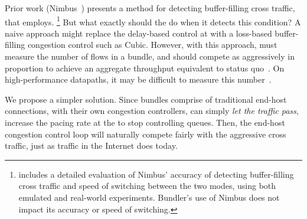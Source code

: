 Prior work (Nimbus~\cite{nimbus-arxiv}) presents a method for detecting buffer-filling cross traffic, that \name employs.
\footnote{\cite{nimbus-arxiv} includes a detailed evaluation of Nimbus' accuracy of detecting buffer-filling cross traffic and speed of switching between the two modes, using both emulated and real-world experiments. Bundler's use of Nimbus does not impact its accuracy or speed of switching.}
But what exactly should the \inbox do when it detects this condition?
A naive approach might replace the delay-based control at \name with a loss-based buffer-filling congestion control such as Cubic. 
However, with this approach, \name must measure the number of flows in a bundle, and should compete as aggressively in proportion to achieve an aggregate throughput equivalent to status quo~\cite{multcp}. On high-performance datapaths, it may be difficult to measure this number~\cite{heavy-hitters}.

We propose a simpler solution.
Since bundles comprise of traditional end-host connections, with their own congestion controllers, \name can simply \emph{let the traffic pass}, \ie increase the pacing rate at the \inbox to stop controlling queues. Then, the end-host congestion control loop will naturally compete fairly with the aggressive cross traffic, just as traffic in the Internet does today.


